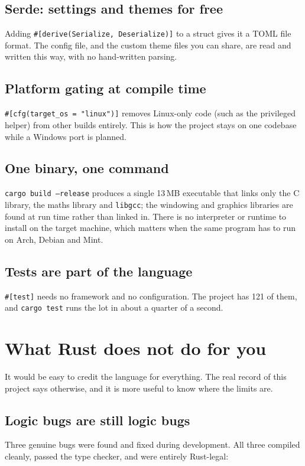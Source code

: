 \documentclass[11pt,a4paper]{article}
\newcommand{\code}[1]{\texttt{#1}}
\begin{document}
\subsection{Serde: settings and themes for free}
Adding \code{\#[derive(Serialize, Deserialize)]} to a struct gives it a TOML file format. The
config file, and the custom theme files you can share, are read and written this way, with no
hand-written parsing.

\subsection{Platform gating at compile time}
\code{\#[cfg(target\_os = "linux")]} removes Linux-only code (such as the privileged helper)
from other builds entirely. This is how the project stays on one codebase while a Windows port
is planned.

\subsection{One binary, one command}
\code{cargo build --release} produces a single 13\,MB executable that links only the C
library, the maths library and \code{libgcc}; the windowing and graphics libraries are found
at run time rather than linked in. There is no interpreter or runtime to install on the target
machine, which matters when the same program has to run on Arch, Debian and Mint.

\subsection{Tests are part of the language}
\code{\#[test]} needs no framework and no configuration. The project has 121 of them, and
\code{cargo test} runs the lot in about a quarter of a second.

\section{What Rust does not do for you}
\label{sec:honest}

It would be easy to credit the language for everything. The real record of this project says
otherwise, and it is more useful to know where the limits are.

\subsection{Logic bugs are still logic bugs}
Three genuine bugs were found and fixed during development. All three compiled cleanly, passed
the type checker, and were entirely Rust-legal:
\end{document}
